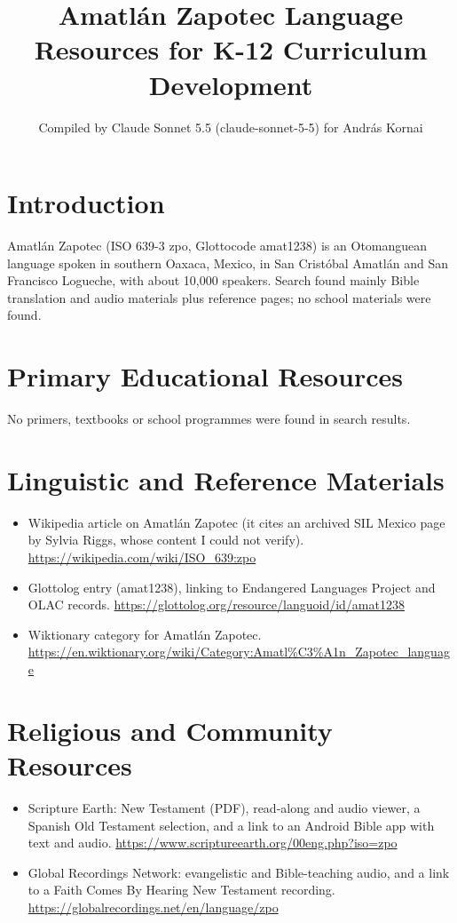 \documentclass[12pt]{article}
\title{Amatl\'an Zapotec Language Resources for K-12 Curriculum Development}
\author{Compiled by Claude Sonnet 5.5 (claude-sonnet-5-5) for Andr\'as Kornai}
\date{}
\begin{document}
\maketitle

\section{Introduction}
Amatl\'an Zapotec (ISO 639-3 zpo, Glottocode amat1238) is an Otomanguean language spoken in southern Oaxaca, Mexico, in San Crist\'obal Amatl\'an and San Francisco Logueche, with about 10,000 speakers. Search found mainly Bible translation and audio materials plus reference pages; no school materials were found.

\section{Primary Educational Resources}
No primers, textbooks or school programmes were found in search results.

\section{Linguistic and Reference Materials}
\begin{itemize}
\item Wikipedia article on Amatl\'an Zapotec (it cites an archived SIL Mexico page by Sylvia Riggs, whose content I could not verify). \url{https://wikipedia.com/wiki/ISO_639:zpo}
\item Glottolog entry (amat1238), linking to Endangered Languages Project and OLAC records. \url{https://glottolog.org/resource/languoid/id/amat1238}
\item Wiktionary category for Amatl\'an Zapotec. \url{https://en.wiktionary.org/wiki/Category:Amatl%C3%A1n_Zapotec_language}
\end{itemize}

\section{Religious and Community Resources}
\begin{itemize}
\item Scripture Earth: New Testament (PDF), read-along and audio viewer, a Spanish Old Testament selection, and a link to an Android Bible app with text and audio. \url{https://www.scriptureearth.org/00eng.php?iso=zpo}
\item Global Recordings Network: evangelistic and Bible-teaching audio, and a link to a Faith Comes By Hearing New Testament recording. \url{https://globalrecordings.net/en/language/zpo}
\end{itemize}
\end{document}
